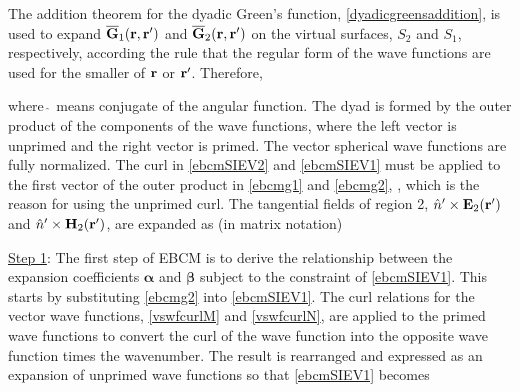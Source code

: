 The addition theorem for the dyadic Green's function, \eqref{dyadicgreensaddition}, is used to expand $\overline{\mathbf{G}}_{1}(\mathbf{r},\mathbf{r}')$ and $\overline{\mathbf{G}}_{2}(\mathbf{r},\mathbf{r}')$ on the virtual surfaces, $S_2$ and $S_1$, respectively, according the rule that the regular form of the wave functions are used for the smaller of $\mathbf{r}$ or $\mathbf{r}'$.  Therefore,

 
\noindent where $\hat{\ }$ means conjugate of the angular function. The dyad is formed by the outer product of the components of the wave functions, where the left vector is unprimed and the right vector is primed. The vector spherical wave functions are fully normalized. The curl in \eqref{ebcmSIEV2} and \eqref{ebcmSIEV1} must be applied to the first vector of the outer product in \eqref{ebcmg1} and \eqref{ebcmg2}, \cite{tai1997general}, which is the reason for using the unprimed curl. The tangential fields of region 2, $\hat{n}'\times\mathbf{E}_2(\mathbf{r}')$ and $\hat{n}'\times\mathbf{H}_2(\mathbf{r}')$, are expanded as (in matrix notation) 
\vspace{-2mm}

\underline{Step 1}: The first step of EBCM is to derive the relationship between the expansion coefficients $\boldsymbol{\alpha}$ and $\boldsymbol{\beta}$ subject to the constraint of \eqref{ebcmSIEV1}. This starts by substituting \eqref{ebcmg2} into \eqref{ebcmSIEV1}. The curl relations for the vector wave functions, \eqref{vswfcurlM} and \eqref{vswfcurlN}, are applied to the primed wave functions to convert the curl of the wave function into the opposite wave function times the wavenumber. The result is rearranged and expressed as an expansion of unprimed wave functions so that \eqref{ebcmSIEV1} becomes

